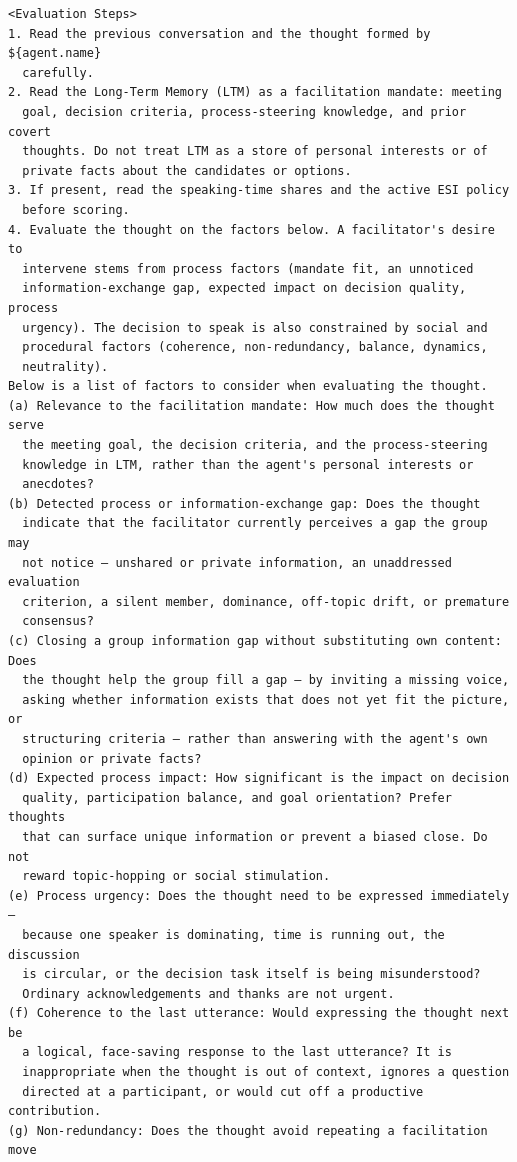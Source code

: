\begin{verbatim}
<Evaluation Steps>
1. Read the previous conversation and the thought formed by ${agent.name}
  carefully.
2. Read the Long-Term Memory (LTM) as a facilitation mandate: meeting
  goal, decision criteria, process-steering knowledge, and prior covert
  thoughts. Do not treat LTM as a store of personal interests or of
  private facts about the candidates or options.
3. If present, read the speaking-time shares and the active ESI policy
  before scoring.
4. Evaluate the thought on the factors below. A facilitator's desire to
  intervene stems from process factors (mandate fit, an unnoticed
  information-exchange gap, expected impact on decision quality, process
  urgency). The decision to speak is also constrained by social and
  procedural factors (coherence, non-redundancy, balance, dynamics,
  neutrality).
Below is a list of factors to consider when evaluating the thought.
(a) Relevance to the facilitation mandate: How much does the thought serve
  the meeting goal, the decision criteria, and the process-steering
  knowledge in LTM, rather than the agent's personal interests or
  anecdotes?
(b) Detected process or information-exchange gap: Does the thought
  indicate that the facilitator currently perceives a gap the group may
  not notice — unshared or private information, an unaddressed evaluation
  criterion, a silent member, dominance, off-topic drift, or premature
  consensus?
(c) Closing a group information gap without substituting own content: Does
  the thought help the group fill a gap — by inviting a missing voice,
  asking whether information exists that does not yet fit the picture, or
  structuring criteria — rather than answering with the agent's own
  opinion or private facts?
(d) Expected process impact: How significant is the impact on decision
  quality, participation balance, and goal orientation? Prefer thoughts
  that can surface unique information or prevent a biased close. Do not
  reward topic-hopping or social stimulation.
(e) Process urgency: Does the thought need to be expressed immediately —
  because one speaker is dominating, time is running out, the discussion
  is circular, or the decision task itself is being misunderstood?
  Ordinary acknowledgements and thanks are not urgent.
(f) Coherence to the last utterance: Would expressing the thought next be
  a logical, face-saving response to the last utterance? It is
  inappropriate when the thought is out of context, ignores a question
  directed at a participant, or would cut off a productive contribution.
(g) Non-redundancy: Does the thought avoid repeating a facilitation move

\end{verbatim}
